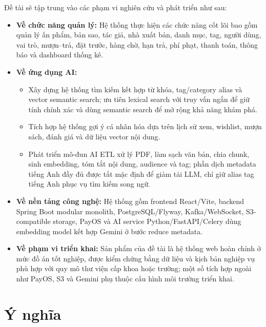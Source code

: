Đề tài sẽ tập trung vào các phạm vi nghiên cứu và phát triển như sau:
\begin{itemize}
    \item \textbf{Về chức năng quản lý:} Hệ thống thực hiện các chức năng cốt
    lõi bao gồm quản lý ấn phẩm, bản sao, tác giả, nhà xuất bản, danh mục, tag,
    người dùng, vai trò, mượn--trả, đặt trước, hàng chờ, hạn trả, phí phạt,
    thanh toán, thông báo và dashboard thống kê.

    \item \textbf{Về ứng dụng AI:}
    \begin{itemize}
        \item Xây dựng hệ thống tìm kiếm kết hợp từ khóa, tag/category alias và
        vector semantic search; ưu tiên lexical search với truy vấn ngắn để giữ
        tính chính xác và dùng semantic search để mở rộng khả năng khám phá.
        \item Tích hợp hệ thống gợi ý cá nhân hóa dựa trên lịch sử xem, wishlist,
        mượn sách, đánh giá và dữ liệu vector nội dung.
        \item Phát triển mô-đun AI ETL xử lý PDF, làm sạch văn bản, chia chunk,
        sinh embedding, tóm tắt nội dung, audience và tag; phần dịch metadata
        tiếng Anh đầy đủ được tắt mặc định để giảm tải LLM, chỉ giữ alias tag
        tiếng Anh phục vụ tìm kiếm song ngữ.
    \end{itemize}

    \item \textbf{Về nền tảng công nghệ:} Hệ thống gồm frontend React/Vite,
    backend Spring Boot modular monolith, PostgreSQL/Flyway, Kafka/WebSocket,
    S3-compatible storage, PayOS và AI service Python/FastAPI/Celery dùng
    embedding model kết hợp Gemini ở bước reduce metadata.

    \item \textbf{Về phạm vi triển khai:} Sản phẩm của đề tài là hệ thống web
    hoàn chỉnh ở mức đồ án tốt nghiệp, được kiểm chứng bằng dữ liệu và kịch bản
    nghiệp vụ phù hợp với quy mô thư viện cấp khoa hoặc trường; một số tích hợp
    ngoài như PayOS, S3 và Gemini phụ thuộc cấu hình môi trường triển khai.
\end{itemize}

\section{Ý nghĩa}
\label{sec:YNghia}

